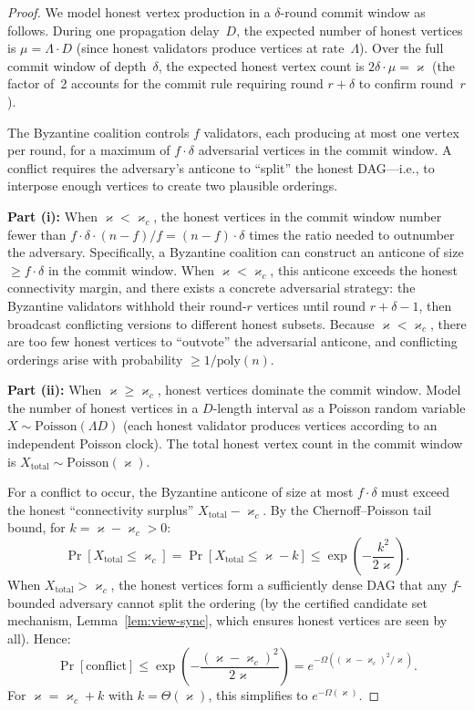 \documentclass[11pt,a4paper]{article}
\theoremstyle{definition}
\theoremstyle{remark}
\renewcommand{\kappa}{\varkappa}
\begin{document}
\begin{proof}
We model honest vertex production in a $\delta$-round commit window as
follows.
During one propagation delay~$D$, the expected number of honest vertices
is $\mu = \Lambda \cdot D$ (since honest validators produce vertices at
rate~$\Lambda$).
Over the full commit window of depth~$\delta$, the expected honest vertex
count is $2\delta \cdot \mu = \kappa$ (the factor of~2 accounts for the
commit rule requiring round $r + \delta$ to confirm round~$r$).

The Byzantine coalition controls $f$ validators, each producing at most
one vertex per round, for a maximum of $f \cdot \delta$ adversarial
vertices in the commit window.
A conflict requires the adversary's anticone to ``split'' the honest
DAG---i.e., to interpose enough vertices to create two plausible
orderings.

\textbf{Part (i):}
When $\kappa < \kappa_c$, the honest vertices in the commit window
number fewer than $f \cdot \delta \cdot (n-f)/f = (n-f) \cdot \delta$
times the ratio needed to outnumber the adversary.
Specifically, a Byzantine coalition can construct an anticone of size
$\geq f \cdot \delta$ in the commit window.
When $\kappa < \kappa_c$, this anticone exceeds the honest connectivity
margin, and there exists a concrete adversarial strategy: the Byzantine
validators withhold their round-$r$ vertices until round $r + \delta - 1$,
then broadcast conflicting versions to different honest subsets.
Because $\kappa < \kappa_c$, there are too few honest vertices to
``outvote'' the adversarial anticone, and conflicting orderings arise
with probability $\geq 1/\mathrm{poly}(n)$.

\textbf{Part (ii):}
When $\kappa \geq \kappa_c$, honest vertices dominate the commit window.
Model the number of honest vertices in a $D$-length interval as a
Poisson random variable $X \sim \mathrm{Poisson}(\Lambda D)$
(each honest validator produces vertices according to an independent
Poisson clock).
The total honest vertex count in the commit window is
$X_{\mathrm{total}} \sim \mathrm{Poisson}(\kappa)$.

For a conflict to occur, the Byzantine anticone of size at most
$f \cdot \delta$ must exceed the honest ``connectivity surplus''
$X_{\mathrm{total}} - \kappa_c$.
By the Chernoff--Poisson tail bound, for $k = \kappa - \kappa_c > 0$:
\[
  \Pr[X_{\mathrm{total}} \leq \kappa_c]
  = \Pr[X_{\mathrm{total}} \leq \kappa - k]
  \leq \exp\!\left(-\frac{k^2}{2\kappa}\right).
\]
When $X_{\mathrm{total}} > \kappa_c$, the honest vertices form a
sufficiently dense DAG that any $f$-bounded adversary cannot split
the ordering (by the certified candidate set mechanism,
Lemma~\ref{lem:view-sync}, which ensures honest vertices are seen
by all).
Hence:
\[
  \Pr[\text{conflict}] \leq \exp\!\left(-\frac{(\kappa - \kappa_c)^2}{2\kappa}\right)
  = e^{-\Omega((\kappa - \kappa_c)^2 / \kappa)}.
\]
For $\kappa = \kappa_c + k$ with $k = \Theta(\kappa)$, this simplifies
to $e^{-\Omega(\kappa)}$.
\end{proof}
\end{document}
